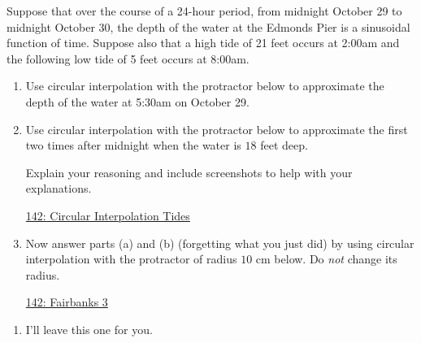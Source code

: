 \documentclass{ximera}
\begin{document}
\begin{example}  \label{E888b0bbdsdsf}
Suppose that over the course of a 24-hour period, from midnight October 29 to midnight October 30, the depth of the water at the Edmonds Pier is a sinusoidal function of time. Suppose also that a high tide of 21 feet occurs at 2:00am and the following low tide of 5 feet occurs at 8:00am. 


\begin{enumerate}
\item Use circular interpolation with the protractor below to approximate the depth of the water at 5:30am on October 29.

\item Use circular interpolation with the protractor below to approximate the first two times after midnight when the water is $18$ feet deep. 

Explain your reasoning and include screenshots to help with your explanations.
\begin{freeResponse}
\end{freeResponse}

\begin{onlineOnly}
    \begin{center}
\end{center}
\end{onlineOnly}

\href{https://www.desmos.com/calculator/0wxwmkzvky}{142: Circular Interpolation Tides}


\item Now answer parts (a) and (b) (forgetting what you just did) by using circular interpolation with the protractor of radius $10$ cm below. Do \emph{not} change its radius.

\begin{onlineOnly}
    \begin{center}
\end{center}
\end{onlineOnly}

\href{https://www.desmos.com/calculator/xvy6s6aw41}{142: Fairbanks 3}
\end{enumerate}

\begin{explanation}
\begin{enumerate}
\item I'll leave this one for you.


\end{enumerate}
\end{explanation}
\end{example}
\end{document}
